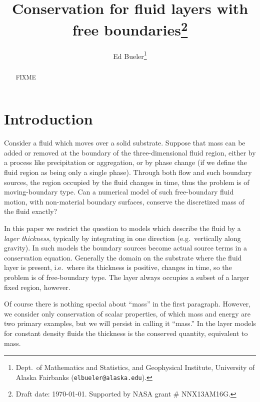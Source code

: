 \documentclass[final,leqno,onefignum,onetabnum]{siamltex1213bueler}
\title{Conservation for fluid layers with free boundaries\thanks{Draft date: \today.  Supported by NASA grant \# NNX13AM16G.}}
\author{Ed Bueler\thanks{Dept.~of Mathematics and Statistics, and Geophysical Institute, University of Alaska Fairbanks (\texttt{elbueler@alaska.edu}).}}
\begin{document}
\maketitle
{}%

\begin{abstract}
FIXME
\end{abstract}




\pagestyle{myheadings}
\thispagestyle{plain}


\section{Introduction}  \label{sec:intro}

Consider a fluid which moves over a solid substrate.  Suppose that mass can be added or removed at the boundary of the three-dimensional fluid region, either by a process like precipitation or aggregation, or by phase change (if we define the fluid region as being only a single phase).  Through both flow and such boundary sources, the region occupied by the fluid changes in time, thus the problem is of moving-boundary type.    Can a numerical model of such free-boundary fluid motion, with non-material boundary surfaces, conserve the discretized mass of the fluid exactly?

In this paper we restrict the question to models which describe the fluid by a \emph{layer thickness}, typically by integrating in one direction (e.g.~vertically along gravity).  In such models the boundary sources become actual source terms in a conservation equation.  Generally the domain on the substrate where the fluid layer is present, i.e.~where its thickness is positive, changes in time, so the problem is of free-boundary type.  The layer always occupies a subset of a larger fixed region, however.

Of course there is nothing special about ``mass'' in the first paragraph.  However, we consider only conservation of scalar properties, of which mass and energy are two primary examples, but we will persist in calling it ``mass.''  In the layer models for constant density fluids the thickness is the conserved quantity, equivalent to mass.
\end{document}
